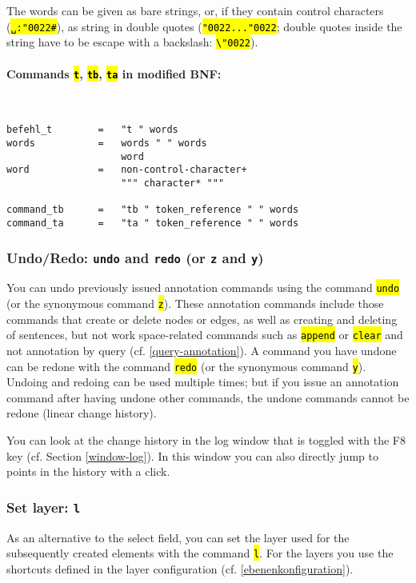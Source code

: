 \documentclass[12pt]{scrartcl}
\newcommand{\quo}{\char"0022}
\newcommand{\code}[1]{\hl{\texttt{#1}}}
\begin{document}
The words can be given as bare strings, or, if they contain control characters (\code{␣:\quo\#}), as string in double quotes (\code{\quo...\quo}; double quotes inside the string have to be escape with a backslash: \code{\textbackslash\quo}).

\paragraph*{Commands \code{t}, \code{tb}, \code{ta} in modified BNF:}
~
\begin{lstlisting}
befehl_t        =   "t " words
words           =   words " " words
                    word
word            =   non-control-character+
                    """ character* """

command_tb      =   "tb " token_reference " " words
command_ta      =   "ta " token_reference " " words
\end{lstlisting}


\subsubsection{Undo/Redo: \texttt{undo} and \texttt{redo} (or \texttt{z} and \texttt{y})}\label{befehl-undo}

You can undo previously issued annotation commands using the command \code{undo} (or the synonymous command \code{z}).
These annotation commands include those commands that create or delete nodes or edges, as well as creating and deleting of sentences, but not work space-related commands such as \code{append} or \code{clear} and not annotation by query (cf. \ref{query-annotation}).
A command you have undone can be redone with the command \code{redo} (or the synonymous command \code{y}).
Undoing and redoing can be used multiple times; but if you issue an annotation command after having undone other commands, the undone commands cannot be redone (linear change history).

You can look at the change history in the log window that is toggled with the F8 key (cf. Section \ref{window-log}).
In this window you can also directly jump to points in the history with a click.


\subsubsection{Set layer: \texttt{l}}\label{befehl-l}

As an alternative to the select field, you can set the layer used for the subsequently created elements with the command \code{l}.
For the layers you use the shortcuts defined in the layer configuration (cf. \ref{ebenenkonfiguration}).
\end{document}
